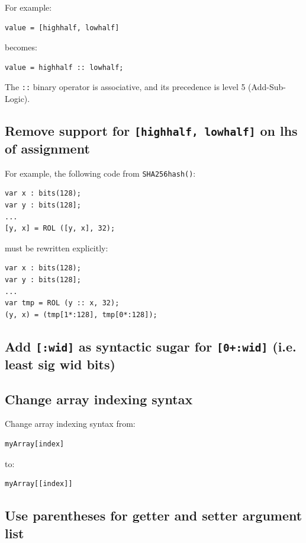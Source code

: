 For example:
\begin{verbatim}
value = [highhalf, lowhalf]
\end{verbatim}

becomes:

\begin{verbatim}
value = highhalf :: lowhalf;
\end{verbatim}

The \texttt{::} binary operator is associative, and its precedence is
level 5 (Add-Sub-Logic).

\subsection{Remove support for \texttt{[highhalf, lowhalf]} on lhs of
assignment}

For example, the following code from \texttt{SHA256hash()}:
\begin{verbatim}
var x : bits(128);
var y : bits(128];
... 
[y, x] = ROL ([y, x], 32);
\end{verbatim}

must be rewritten explicitly:
\begin{verbatim}
var x : bits(128);
var y : bits(128];
... 
var tmp = ROL (y :: x, 32);
(y, x) = (tmp[1*:128], tmp[0*:128]);
\end{verbatim}

\subsection{Add \texttt{[:wid]} as syntactic sugar for \texttt{[0+:wid]} (i.e.
least sig wid bits)}

\subsection{Change array indexing syntax}

Change array indexing syntax from:
\begin{verbatim}
myArray[index]
\end{verbatim}

to:
\begin{verbatim}
myArray[[index]]
\end{verbatim}

\subsection{Use parentheses for getter and setter argument list}

